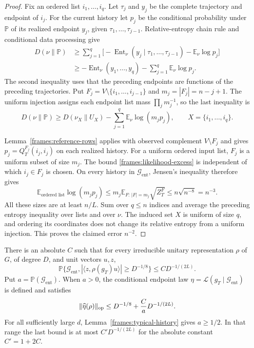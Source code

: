 \begin{proof}
Fix an ordered list $i_1,\ldots,i_q$. Let $\tau_j$ and $y_j$ be the
complete trajectory and endpoint of $i_j$. For the current history let
$p_j$ be the conditional probability under $\mathbb P$ of its realized
endpoint $y_j$, given $\tau_1,\ldots,\tau_{j-1}$. Relative-entropy
chain rule and conditional data processing give
\begin{align*}
 D(\nu\|\mathbb P)
 &\ge\sum_{j=1}^q\bigl[-\operatorname{Ent}_\nu
     (y_j\mid\tau_1,\ldots,\tau_{j-1})-\mathbb E_\nu\log p_j\bigr]\\
 &\ge-\operatorname{Ent}_\nu(y_1,\ldots,y_q)
                              -\sum_{j=1}^q\mathbb E_\nu\log p_j.
\end{align*}
The second inequality uses that the preceding endpoints are functions
of the preceding trajectories. Put
$F_j=V\setminus\{i_1,\ldots,i_{j-1}\}$ and $m_j=|F_j|=n-j+1$.
The uniform injection assigns each endpoint list mass
$\prod_jm_j^{-1}$, so the last inequality is
\[
 D(\nu\|\mathbb P)\ge D(\nu_X\|U_X)
                     -\sum_{j=1}^q\mathbb E_\nu\log(m_jp_j),
 \qquad X=\{i_1,\ldots,i_q\}.
\]

Lemma~\ref{frames:reference-rows} applies with observed complement
$V\setminus F_j$ and gives $p_j=Q_T^{F_j}(i_j,i_j)$ on each realized
history. For a uniform ordered input list, $F_j$ is a uniform subset
of size $m_j$. The bound \eqref{frames:likelihood-excess} is independent
of which $i_j\in F_j$ is chosen. On every history in $\mathcal G_{\mathrm{ent}}$,
Jensen's inequality therefore gives
\[
 \mathbb E_{\text{ordered list}}\log(m_jp_j)
 \le m_j\mathbb E_{F:\,|F|=m_j}\sqrt{Z_T^F}
 \le n\sqrt{n^{-8}}=n^{-3}.
\]
All these sizes are at least $n/L$. Sum over $q\le n$ indices and
average the preceding entropy inequality over lists and over $\nu$.
The induced set $X$ is uniform of size $q$, and ordering its coordinates
does not change its relative entropy from a uniform injection. This
proves the claimed error $n^{-2}$.
\end{proof}

\begin{proposition}
\label{frames:entropy-tail}
There is an absolute $C$ such that for every irreducible unitary
representation $\rho$ of $G$, of degree $D$, and unit vectors $u,z$,
\begin{equation}
 \mathbb P\{\mathcal G_{\mathrm{ent}},
       |\langle z,\rho(g_T)u\rangle|\ge D^{-1/8}\}
 \le C D^{-1/(2L)}.
 \label{frames:coefficient-tail}
\end{equation}
Put $a=\mathbb P(\mathcal G_{\mathrm{ent}})$. When $a>0$, the conditional endpoint law
$\eta=\mathcal L(g_T\mid\mathcal G_{\mathrm{ent}})$ is defined and satisfies
\[
 \|\widehat\eta(\rho)\|_{\rm op}
 \le D^{-1/8}+\frac{C}{a}D^{-1/(2L)}.
\]
For all sufficiently large $d$, Lemma~\ref{frames:typical-history}
gives $a\ge1/2$. In that range the last bound is at most
$C'D^{-1/(2L)}$ for the absolute constant $C'=1+2C$.
\end{proposition}

